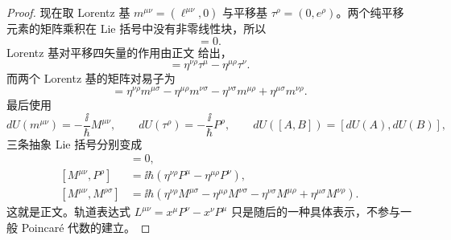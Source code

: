 \begin{proof}
现在取 Lorentz 基 $m^{\mu\nu}=(\ell^{\mu\nu},0)$ 与平移基 $\tau^\rho=(0,e^\rho)$。两个纯平移元素的矩阵乘积在 Lie 括号中没有非零线性块，所以
\begin{equation*}
 [\tau^\mu,\tau^\nu]=0.
\end{equation*}
Lorentz 基对平移四矢量的作用由正文 给出，
\begin{equation*}
 [m^{\mu\nu},\tau^\rho]
 =\eta^{\nu\rho}\tau^\mu-\eta^{\mu\rho}\tau^\nu.
\end{equation*}
而两个 Lorentz 基的矩阵对易子为
\begin{equation*}
[m^{\mu\nu},m^{\rho\sigma}]
=\eta^{\nu\rho}m^{\mu\sigma}
-\eta^{\mu\rho}m^{\nu\sigma}
-\eta^{\nu\sigma}m^{\mu\rho}
+\eta^{\mu\sigma}m^{\nu\rho}.
\end{equation*}
最后使用
\begin{equation*}
 dU(m^{\mu\nu})=-\frac{\ii}{\hbar}M^{\mu\nu},
 \qquad
 dU(\tau^\rho)=-\frac{\ii}{\hbar}P^\rho,
 \qquad
 dU([A,B])=[dU(A),dU(B)],
\end{equation*}
三条抽象 Lie 括号分别变成
\begin{align*}
 [P^\mu,P^\nu]&=0,\\
 [M^{\mu\nu},P^\rho]
 &=\ii\hbar(\eta^{\nu\rho}P^\mu-\eta^{\mu\rho}P^\nu),\\
 [M^{\mu\nu},M^{\rho\sigma}]
 &=\ii\hbar\left(
 \eta^{\nu\rho}M^{\mu\sigma}
 -\eta^{\mu\rho}M^{\nu\sigma}
 -\eta^{\nu\sigma}M^{\mu\rho}
 +\eta^{\mu\sigma}M^{\nu\rho}\right).
\end{align*}
这就是正文。轨道表达式 $L^{\mu\nu}=x^\mu P^\nu-x^\nu P^\mu$ 只是随后的一种具体表示，不参与一般 Poincar\'e 代数的建立。
\end{proof}

